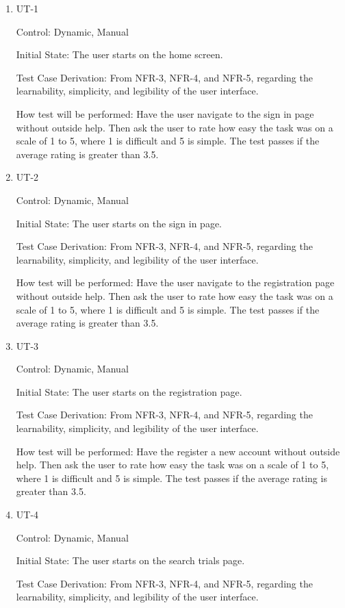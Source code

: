 \documentclass[12pt, titlepage]{article}
\begin{document}
\begin{enumerate}

\item{UT-1}

Control: Dynamic, Manual
					
Initial State: The user starts on the home screen.

Test Case Derivation: From NFR-3, NFR-4, and NFR-5, regarding the learnability, simplicity, and legibility of the user interface.

How test will be performed: Have the user navigate to the sign in page without outside help. Then ask the user to 
rate how easy the task was on a scale of 1 to 5, where 1 is difficult and 5 is simple. The test passes if the average 
rating is greater than 3.5.

\item{UT-2}

Control: Dynamic, Manual
					
Initial State: The user starts on the sign in page.

Test Case Derivation: From NFR-3, NFR-4, and NFR-5, regarding the learnability, simplicity, and legibility of the user interface.

How test will be performed: Have the user navigate to the registration page without outside help. Then ask the user to 
rate how easy the task was on a scale of 1 to 5, where 1 is difficult and 5 is simple. The test passes if the average 
rating is greater than 3.5.

\item{UT-3}

Control: Dynamic, Manual
					
Initial State: The user starts on the registration page.

Test Case Derivation: From NFR-3, NFR-4, and NFR-5, regarding the learnability, simplicity, and legibility of the user interface.

How test will be performed: Have the register a new account without outside help. Then ask the user to 
rate how easy the task was on a scale of 1 to 5, where 1 is difficult and 5 is simple. The test passes if the average 
rating is greater than 3.5.

\item{UT-4}

Control: Dynamic, Manual
					
Initial State: The user starts on the search trials page.

Test Case Derivation: From NFR-3, NFR-4, and NFR-5, regarding the learnability, simplicity, and legibility of the user interface.


\end{enumerate}
\end{document}
